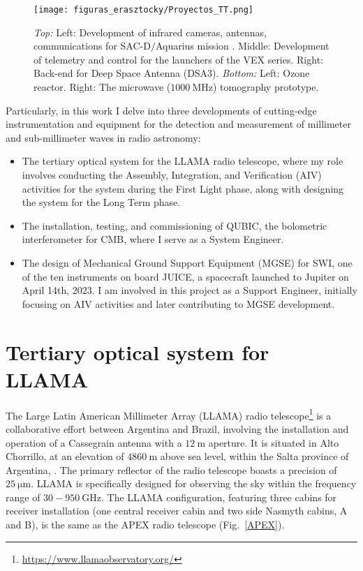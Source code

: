 \documentclass[baaa]{baaa}
\begin{document}
\begin{figure}[!t]
\centering
\texttt{[image: figuras\_erasztocky/Proyectos\_TT.png]}
\caption{\emph{Top:} Left: Development of infrared cameras, antennas, communications for SAC-D$/$Aquarius mission \citep{sen2006aquarius}. Middle: Development of telemetry and control for the launchers of the VEX series. Right: Back-end for Deep Space Antenna (DSA3)\citep{benaglia2011antenna}. \emph{Bottom:} Left: Ozone reactor\citep{romero2020canon}. Right: The microwave ($1000~\mathrm{MHz}$) tomography prototype\citep{fajardo2020tomografia}.}
\label{proyectos}
\end{figure}

Particularly, in this work I delve into three developments of cutting-edge instrumentation and equipment for the detection and measurement of millimeter and sub-millimeter waves in radio astronomy:
\begin{itemize}
    \item The tertiary optical system for the LLAMA radio telescope, where my role involves conducting the Assembly, Integration, and Verification (AIV) activities for the system during the First Light phase, along with designing the system for the Long Term phase.
    \item The installation, testing, and commissioning of QUBIC, the bolometric interferometer for CMB, where I serve as a System Engineer.
    \item The design of Mechanical Ground Support Equipment (MGSE) for SWI, one of the ten instruments on board JUICE, a spacecraft launched to Jupiter on April 14th, 2023. I am involved in this project as a Support Engineer, initially focusing on AIV activities and later contributing to MGSE development.
\end{itemize}

\section{Tertiary optical system for LLAMA}\label{sec:LLAMA}

The Large Latin American Millimeter Array (LLAMA) radio telescope\footnote{\url{https://www.llamaobservatory.org/}} is a collaborative effort between Argentina and Brazil, involving the installation and operation of a Cassegrain antenna with a $12~\mathrm{m}$ aperture. It is situated in Alto Chorrillo, at an elevation of $4860~\mathrm{m}$ above sea level, within the Salta province of Argentina\citep{lepine2021llama}, \citep{romero2020large}. The primary reflector of the radio telescope boasts a precision of $25~\mathrm{\mu m}$. LLAMA is specifically designed for observing the sky within the frequency range of $30-950~\mathrm{GHz}$. The LLAMA configuration, featuring three cabins for receiver installation (one central receiver cabin and two side Nasmyth cabins, A and B), is the  same as the APEX radio telescope \citep{gusten2006atacama} (Fig.~\ref{APEX}).
\end{document}

